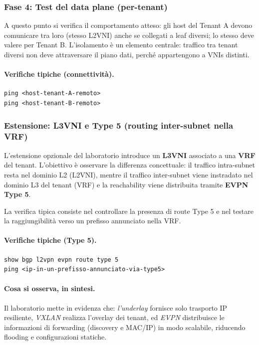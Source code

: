 \subsubsection{Fase 4: Test del data plane (per-tenant)}

A questo punto si verifica il comportamento atteso:
gli host del Tenant A devono comunicare tra loro (stesso L2VNI) anche se collegati a leaf diversi; lo stesso deve valere per Tenant B. L’isolamento è un elemento centrale: traffico tra tenant diversi non deve attraversare il piano dati, perché appartengono a VNIs distinti.

\paragraph{Verifiche tipiche (connettività).}
\begin{verbatim}
ping <host-tenant-A-remoto>
ping <host-tenant-B-remoto>
\end{verbatim}

\subsubsection{Estensione: L3VNI e Type 5 (routing inter-subnet nella VRF)}

L’estensione opzionale del laboratorio introduce un \textbf{L3VNI} associato a una \textbf{VRF} del tenant. L’obiettivo è osservare la differenza concettuale:
il traffico intra-subnet resta nel dominio L2 (L2VNI), mentre il traffico inter-subnet viene instradato nel dominio L3 del tenant (VRF) e la reachability viene distribuita tramite \textbf{EVPN Type 5}.

La verifica tipica consiste nel controllare la presenza di route Type 5 e nel testare la raggiungibilità verso un prefisso annunciato nella VRF.

\paragraph{Verifiche tipiche (Type 5).}
\begin{verbatim}
show bgp l2vpn evpn route type 5
ping <ip-in-un-prefisso-annunciato-via-type5>
\end{verbatim}

\paragraph{Cosa si osserva, in sintesi.}
Il laboratorio mette in evidenza che:
\emph{l’underlay} fornisce solo trasporto IP resiliente,
\emph{VXLAN} realizza l’overlay dei tenant,
ed \emph{EVPN} distribuisce le informazioni di forwarding (discovery e MAC/IP) in modo scalabile, riducendo flooding e configurazioni statiche.
